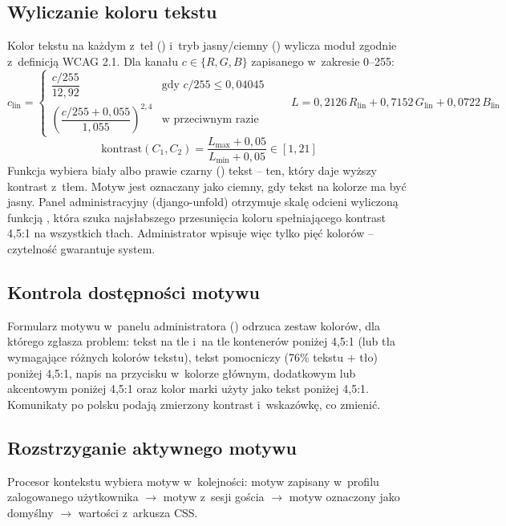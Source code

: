 \subsection{Wyliczanie koloru tekstu}
Kolor tekstu na każdym z~teł () i~tryb jasny/ciemny
() wylicza moduł  zgodnie z~definicją WCAG
2.1. Dla kanału $c \in \{R,G,B\}$ zapisanego w~zakresie 0--255:
\[
c_{\text{lin}} = \begin{cases} \dfrac{c/255}{12{,}92} & \text{gdy } c/255 \le 0{,}04045\\[8pt]
\left(\dfrac{c/255 + 0{,}055}{1{,}055}\right)^{2{,}4} & \text{w~przeciwnym razie}\end{cases}
\qquad L = 0{,}2126\,R_{\text{lin}} + 0{,}7152\,G_{\text{lin}} + 0{,}0722\,B_{\text{lin}}
\]
\[
\text{kontrast}(C_1, C_2) = \frac{L_{\max} + 0{,}05}{L_{\min} + 0{,}05} \in [1, 21]
\]
Funkcja  wybiera biały albo prawie czarny
() tekst -- ten, który daje wyższy kontrast z~tłem. Motyw jest oznaczany
jako ciemny, gdy tekst na kolorze  ma być jasny. Panel administracyjny
(django-unfold) otrzymuje skalę odcieni wyliczoną funkcją , która
szuka najsłabszego przesunięcia koloru spełniającego kontrast 4,5:1 na wszystkich tłach.
Administrator wpisuje więc tylko pięć kolorów -- czytelność gwarantuje system.

\subsection{Kontrola dostępności motywu}\label{sec:theme-check}
Formularz motywu w~panelu administratora () odrzuca zestaw kolorów,
dla którego  zgłasza problem: tekst na tle i~na tle
kontenerów poniżej 4,5:1 (lub tła wymagające różnych kolorów tekstu), tekst pomocniczy (76\%
tekstu + tło) poniżej 4,5:1, napis na przycisku w~kolorze głównym, dodatkowym lub akcentowym
poniżej 4,5:1 oraz kolor marki użyty jako tekst poniżej 4,5:1. Komunikaty po polsku podają
zmierzony kontrast i~wskazówkę, co zmienić.

\subsection{Rozstrzyganie aktywnego motywu}
Procesor kontekstu  wybiera motyw w~kolejności: motyw zapisany
w~profilu zalogowanego użytkownika $\rightarrow$ motyw z~sesji gościa $\rightarrow$
motyw oznaczony jako domyślny $\rightarrow$ wartości z~arkusza CSS.

